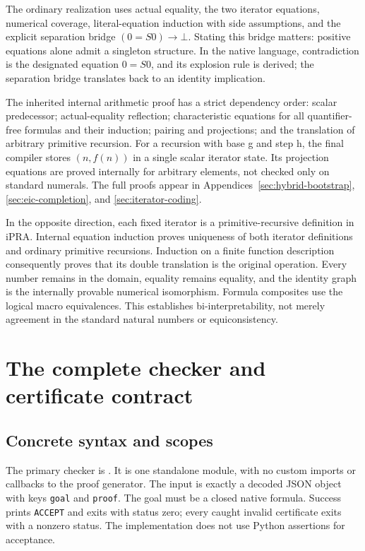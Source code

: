 \documentclass[11pt,letterpaper]{article}
\theoremstyle{definition}
\begin{document}
The ordinary realization uses actual equality, the two iterator
equations, numerical coverage, literal-equation induction with side
assumptions, and the explicit separation bridge
\((0=S0)\to\bot\). Stating this bridge matters: positive equations alone
admit a singleton structure. In the native language, contradiction is
the designated equation \(0=S0\), and its explosion rule is derived;
the separation bridge translates back to an identity implication.

The inherited internal arithmetic proof has a strict dependency order:
scalar predecessor; actual-equality reflection; characteristic equations
for all quantifier-free formulas and their induction; pairing and
projections; and the translation of arbitrary primitive recursion.
For a recursion with base g and step h, the final compiler stores
\((n,f(n))\) in a single scalar iterator state. Its projection equations
are proved internally for arbitrary elements, not checked only on
standard numerals. The full proofs appear in
Appendices~\ref{sec:hybrid-bootstrap}, \ref{sec:eic-completion}, and
\ref{sec:iterator-coding}.

In the opposite direction, each fixed iterator is a primitive-recursive
definition in iPRA. Internal equation induction proves uniqueness of
both iterator definitions and ordinary primitive recursions. Induction
on a finite function description consequently proves that its double
translation is the original operation. Every number remains in the
domain, equality remains equality, and the identity graph is the
internally provable numerical isomorphism. Formula composites use the
logical macro equivalences. This establishes bi-interpretability, not
merely agreement in the standard natural numbers or equiconsistency.

\section{The complete checker and certificate contract}
\label{sec:checker}

\subsection{Concrete syntax and scopes}

The primary checker is . It is one standalone
module, with no custom imports or callbacks to the proof generator.
The input is exactly a decoded JSON object with keys \texttt{goal}
and \texttt{proof}. The goal must be a closed native formula. Success
prints \texttt{ACCEPT} and exits with status zero; every caught invalid
certificate exits with a nonzero status. The implementation does not
use Python assertions for acceptance.
\end{document}
